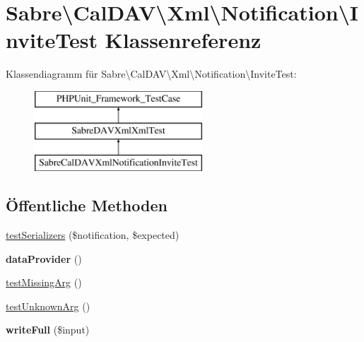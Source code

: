 \hypertarget{class_sabre_1_1_cal_d_a_v_1_1_xml_1_1_notification_1_1_invite_test}{}\section{Sabre\textbackslash{}Cal\+D\+AV\textbackslash{}Xml\textbackslash{}Notification\textbackslash{}Invite\+Test Klassenreferenz}
\label{class_sabre_1_1_cal_d_a_v_1_1_xml_1_1_notification_1_1_invite_test}
Klassendiagramm für Sabre\textbackslash{}Cal\+D\+AV\textbackslash{}Xml\textbackslash{}Notification\textbackslash{}Invite\+Test\+:\begin{figure}[H]
\begin{center}
\leavevmode
\includegraphics[height=3.000000cm]{class_sabre_1_1_cal_d_a_v_1_1_xml_1_1_notification_1_1_invite_test}
\end{center}
\end{figure}
\subsection*{Öffentliche Methoden}
\begin{DoxyCompactItemize}
\item 
\mbox{\hyperlink{class_sabre_1_1_cal_d_a_v_1_1_xml_1_1_notification_1_1_invite_test_ae75956327d76aa6ac4a13de9b37df6ef}{test\+Serializers}} (\$notification, \$expected)
\item 
\mbox{\label{class_sabre_1_1_cal_d_a_v_1_1_xml_1_1_notification_1_1_invite_test_a6ae1c2defefff3d209fe5953fa8ab782}} 
{\bfseries data\+Provider} ()
\item 
\mbox{\hyperlink{class_sabre_1_1_cal_d_a_v_1_1_xml_1_1_notification_1_1_invite_test_ab8809b0318e9f60b2bad746a64394b7e}{test\+Missing\+Arg}} ()
\item 
\mbox{\hyperlink{class_sabre_1_1_cal_d_a_v_1_1_xml_1_1_notification_1_1_invite_test_a12c2596012db403fdf3021fe706746ce}{test\+Unknown\+Arg}} ()
\item 
\mbox{\label{class_sabre_1_1_cal_d_a_v_1_1_xml_1_1_notification_1_1_invite_test_a547165be303f90c2436dfc4eec610c8f}} 
{\bfseries write\+Full} (\$input)
\end{DoxyCompactItemize}
